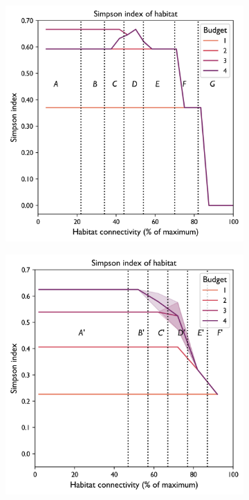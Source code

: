 \begin{figure}[H]
     \centering
     \begin{subfigure}[b]{0.4\textwidth}
         \centering
         \includegraphics[width=\textwidth]{figures/wildland/simpson_index3.png}
         \caption{}
         \label{fig:indicator_simpson3}
     \end{subfigure}
    \begin{subfigure}[b]{0.4\textwidth}
         \centering
         \includegraphics[width=.985\textwidth]{figures/wildland/simpson_index4.png}

\end{subfigure}
\end{figure}
